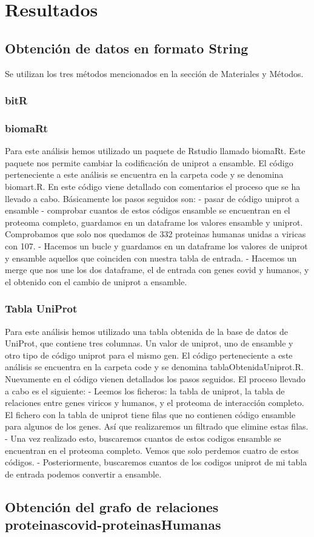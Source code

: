 
\section{Resultados}


\subsection{Obtención de datos en formato String}
Se utilizan los tres métodos mencionados en la sección de Materiales y Métodos.

\subsubsection{bitR}


\subsubsection{biomaRt}
Para este análisis hemos utilizado un paquete de Rstudio llamado biomaRt. Este paquete nos permite cambiar la codificación de uniprot a ensamble.
El código perteneciente a este análisis se encuentra en la carpeta code y se denomina biomart.R. En este código viene detallado con comentarios el
proceso que se ha llevado a cabo. Básicamente los pasos seguidos son: 
- pasar de código uniprot a ensamble
- comprobar cuantos de estos códigos ensamble se encuentran en el proteoma completo, guardamos en un dataframe los valores ensamble y uniprot.  Comprobamos que solo nos quedamos de 332 proteinas humanas unidas a viricas con 107.
- Hacemos un bucle y guardamos en un dataframe los valores de uniprot y ensamble aquellos que coinciden con nuestra tabla de entrada.
- Hacemos un merge que nos une los dos dataframe, el de entrada con genes covid y humanos, y el obtenido con el cambio de uniprot a ensamble. 


\subsubsection{Tabla UniProt}
Para este análisis hemos utilizado una tabla obtenida de la base de datos de UniProt, que contiene tres columnas. Un valor de uniprot, uno de ensamble y otro tipo de código uniprot para el mismo gen. 
El código perteneciente a este análisis se encuentra en la carpeta code y se denomina tablaObtenidaUniprot.R. Nuevamente en el código vienen detallados los pasos seguidos. 
El proceso llevado a cabo es el siguiente:
- Leemos los ficheros: la tabla de uniprot, la tabla de relaciones entre genes viricos y humanos, y el proteoma de interacción completo. El fichero con la tabla de uniprot tiene filas que no contienen código ensamble para algunos de los genes. Así que realizaremos un filtrado que elimine estas filas.
- Una vez realizado esto, buscaremos cuantos de estos codigos ensamble se encuentran en el proteoma completo. Vemos que solo perdemos cuatro de estos códigos.
- Posteriormente, buscaremos cuantos de los codigos uniprot de mi tabla de entrada podemos convertir a ensamble. 


\subsection{Obtención del grafo de relaciones proteinascovid-proteinasHumanas}

\
